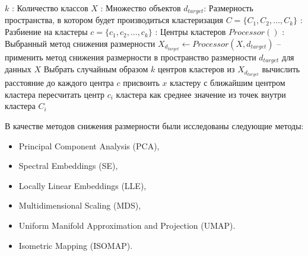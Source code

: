        \begin{algorithm}[H]
            \small
            \caption{Кластеризация с предварительным снижением размерности}
            \label{alg:main_algo}
            \begin{algorithmic}
                \State \(k\) : Количество классов
                \State \(X\) : Множество объектов
                \State \(d_{target}\): Размерность пространства, в котором будет производиться кластеризация
                \State \(C=\{C_1, C_2, \dots, C_k\}\) : Разбиение на кластеры
                \State \(c=\{c_1, c_2, \dots, c_k\}\) : Центры кластеров
                \State \(Processor()\) : Выбранный метод снижения размерности
                \Statex
                \State \(X_{d_{target}} \gets Processor(X, d_{target})\) -- применить метод снижения размерности в пространство размерности \(d_{target}\) для данных \(X\)
                \State Выбрать случайным образом \(k\) центров кластеров из \(X_{d_{target}}\)
                        \State вычислить расстояние до каждого центра \(c\)
                        \State присвоить \(x\) кластеру с ближайшим центром кластера
                    \EndFor
                        \State пересчитать центр \(c_i\) кластера как среднее значение из точек внутри кластера \(C_i\)
                    \EndFor
                \EndWhile
                \end{algorithmic}
        \end{algorithm}

        В качестве методов снижения размерности были исследованы следующие методы:
        \begin{itemize}
            \item Principal Component Analysis (PCA),
            \item Spectral Embeddings (SE),
            \item Locally Linear Embeddings (LLE),
            \item Multidimensional Scaling (MDS),
            \item Uniform Manifold Approximation and Projection (UMAP).
            \item Isometric Mapping (ISOMAP).
        \end{itemize}

